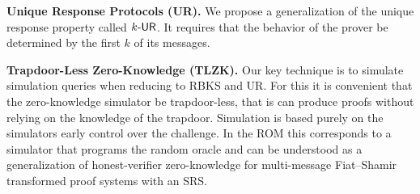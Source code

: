 \documentclass[11pt]{llncs}
\newcommand{\oursubsub}[1] {\smallskip\noindent\textbf{#1}}
\begin{document}

\oursubsub{Unique Response Protocols (UR).}  
We propose a generalization of the unique response property called ${k\text{-}\mathsf{UR}}$. It requires that the behavior of the prover be determined by the first
$k$ of its messages. 

\oursubsub{Trapdoor-Less Zero-Knowledge (TLZK).} 
Our key technique is to simulate simulation queries when reducing to RBKS and UR. For this it is convenient that the zero-knowledge simulator be trapdoor-less, that is can produce proofs without relying on the
knowledge of the trapdoor. Simulation is based purely on the simulators early control over the challenge. 
%
In the ROM this corresponds to a simulator that programs the random oracle and can be understood as a generalization of honest-verifier zero-knowledge for multi-message Fiat--Shamir transformed proof systems with an
SRS. 
\end{document}

